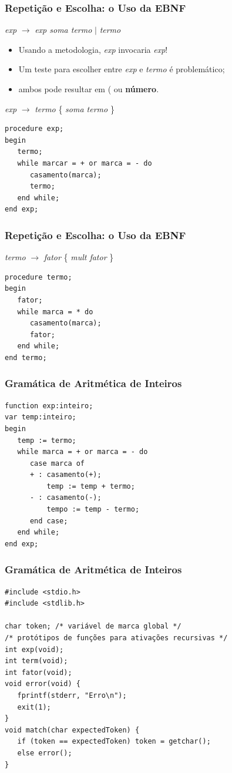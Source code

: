 \documentclass[table]{beamer}
\begin{document}
\begin{frame}[fragile]
   \frametitle{Repetição e Escolha: o Uso da EBNF}
   \begin{center}
   \textit{exp} $\to$ \textit{exp soma termo} $|$ \textit{termo}
   \end{center}
   \begin{itemize}
      \item Usando a metodologia, \textit{exp} invocaria \textit{exp}!
      \item Um teste para escolher entre \textit{exp} e \textit{termo} é problemático;
      \item ambos pode resultar em ( ou \textbf{número}.
   \end{itemize}
   \begin{center}
   \textit{exp} $\to$ \textit{termo} \{ \textit{soma termo} \}
   \end{center}
   \begin{verbatim}
procedure exp;
begin 
   termo;
   while marcar = + or marca = - do
      casamento(marca);
      termo;
   end while;
end exp;
   \end{verbatim}
\end{frame}

\begin{frame}[fragile]
   \frametitle{Repetição e Escolha: o Uso da EBNF}
   \begin{center}
   \textit{termo} $\to$ \textit{fator} \{ \textit{mult fator} \}
   \end{center}
   \begin{verbatim}
procedure termo;
begin
   fator;
   while marca = * do
      casamento(marca);
      fator;
   end while;   
end termo;
   \end{verbatim}
\end{frame}

\begin{frame}[fragile]
   \frametitle{Gramática de Aritmética de Inteiros}
   \begin{verbatim}
function exp:inteiro;
var temp:inteiro;
begin
   temp := termo;
   while marca = + or marca = - do
      case marca of
      + : casamento(+);
          temp := temp + termo; 
      - : casamento(-);
          tempo := temp - termo;
      end case;	  
   end while;
end exp;
   \end{verbatim}
\end{frame}

\begin{frame}[fragile]
   \frametitle{Gramática de Aritmética de Inteiros}
   \begin{verbatim}
#include <stdio.h>
#include <stdlib.h>

char token; /* variável de marca global */
/* protótipos de funções para ativações recursivas */
int exp(void);
int term(void);
int fator(void);
void error(void) {
   fprintf(stderr, "Erro\n");
   exit(1);
}
void match(char expectedToken) {
   if (token == expectedToken) token = getchar();
   else error();
}
   \end{verbatim}
\end{frame}
\end{document}
